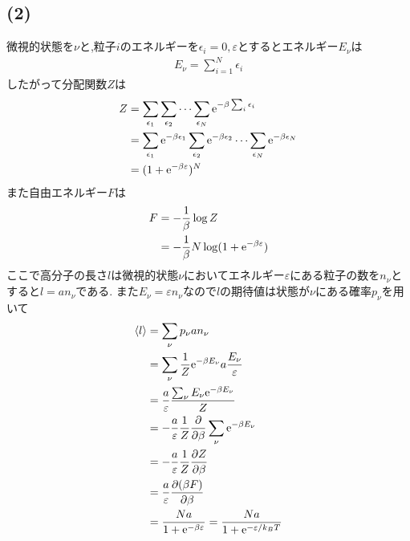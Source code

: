 \clearpage
\subsection*{(2)}
微視的状態を$\nu$と,粒子$i$のエネルギーを$\epsilon_i=0,\varepsilon$とするとエネルギー$E_\nu$は
\begin{align}
  E_\nu=\sum_{i=1}^N\epsilon_i
\end{align}
したがって分配関数$Z$は
\begin{align}
  \begin{split}
    Z&=\sum_{\epsilon_1}\sum_{\epsilon_2}\cdots\sum_{\epsilon_N}{\rm e}^{-\beta\sum_i\epsilon_i}\\
    &=\sum_{\epsilon_1}{\rm e}^{-\beta\epsilon_1}\sum_{\epsilon_2}{\rm e}^{-\beta\epsilon_2}\cdots\sum_{\epsilon_N}{\rm e}^{-\beta\epsilon_N}\\
    &=(1+{\rm e}^{-\beta\varepsilon})^N
  \end{split}
\end{align}
また自由エネルギー$F$は
\begin{align}
  F&=-\frac{1}{\beta}\log Z\\
  &=-\frac{1}{\beta}N\log(1+{\rm e}^{-\beta\varepsilon})
\end{align}
ここで高分子の長さ$l$は微視的状態$\nu$においてエネルギー$\varepsilon$にある粒子の数を$n_\nu$とすると$l=an_\nu$である.
また$E_\nu=\varepsilon n_\nu$なので$l$の期待値は状態が$\nu$にある確率$p_\nu$を用いて
\begin{align}
  \begin{split}
    \langle l\rangle&=\sum_\nu p_\nu an_\nu\\
    &=\sum_\nu \frac{1}{Z}{\rm e}^{-\beta E_\nu}a\frac{E_\nu}{\varepsilon}\\
    &=\frac{a}{\varepsilon}\frac{\sum_\nu E_\nu{\rm e}^{-\beta E_\nu}}{Z}\\
    &=-\frac{a}{\varepsilon}\frac{1}{Z}\frac{\partial}{\partial\beta}\sum_\nu{\rm e}^{-\beta E_\nu}\\
    &=-\frac{a}{\varepsilon}\frac{1}{Z}\frac{\partial Z}{\partial\beta}\\
    &=\frac{a}{\varepsilon}\frac{\partial(\beta F)}{\partial\beta}\\
    &=\frac{Na}{1+{\rm e}^{-\beta\varepsilon}}=\frac{Na}{1+{\rm e}^{-\varepsilon/k_BT}}
  \end{split}
\end{align}
